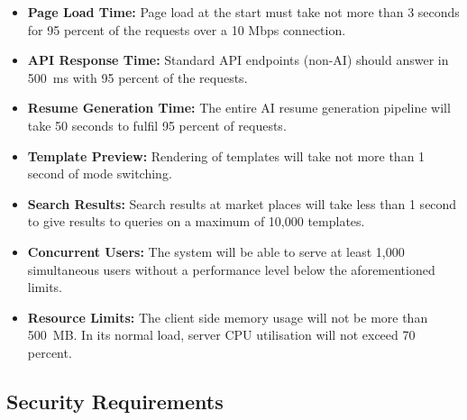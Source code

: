 \documentclass[12pt, a4paper, oneside]{report}
\begin{document}
\begin{itemize}
    \item \textbf{Page Load Time:} Page load at the start must take not more than 3 seconds for 95 percent of the requests over a 10 Mbps connection.
    \item \textbf{API Response Time:} Standard API endpoints (non-AI) should answer in 500~ms with 95 percent of the requests.
    \item \textbf{Resume Generation Time:} The entire AI resume generation pipeline will take 50 seconds to fulfil 95 percent of requests.
    \item \textbf{Template Preview:} Rendering of templates will take not more than 1 second of mode switching.
    \item \textbf{Search Results:} Search results at market places will take less than 1 second to give results to queries on a maximum of 10,000 templates.
    \item \textbf{Concurrent Users:} The system will be able to serve at least 1,000 simultaneous users without a performance level below the aforementioned limits.
    \item \textbf{Resource Limits:} The client side memory usage will not be more than 500~MB. In its normal load, server CPU utilisation will not exceed 70 percent.
\end{itemize}

\subsection{Security Requirements}
\end{document}
